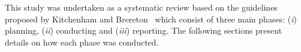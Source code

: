 This study was undertaken as a systematic review based on the guidelines proposed by Kitchenham and Brereton~\cite{Kitchenham} which consist of three main phases: (\textit{i}) planning, (\textit{ii}) conducting and (\textit{iii}) reporting. The following sections present details on how each phase was conducted.


